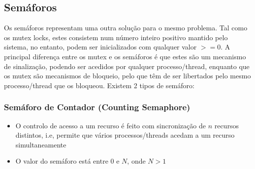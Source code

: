 \documentclass[10pt,a4paper]{report}
\begin{document}
\subsection{Semáforos}
Os semáforos representam uma outra solução para o mesmo problema. Tal como os mutex locks, estes consistem num número inteiro positivo mantido pelo sistema, no entanto, podem ser inicializados com qualquer valor $>= 0$. A principal diferença entre os mutex e os semáforos é que estes são um mecanismo de sinalização, podendo ser acedidos por qualquer processo/thread, enquanto que os mutex são mecanismos de bloqueio, pelo que têm de ser libertados pelo mesmo processo/thread que os bloqueou. Existem 2 tipos de semáforo:
\subsubsection{Semáforo de Contador (Counting Semaphore)}
\begin{itemize}
\item O controlo de acesso a um recurso é feito com sincronização de $n$ recursos distintos, i.e, permite que vários processos/threads acedam a um recurso simultaneamente
\item O valor do semáforo está entre 0 e $N$, onde $N > 1$
\end{itemize}
\end{document}
